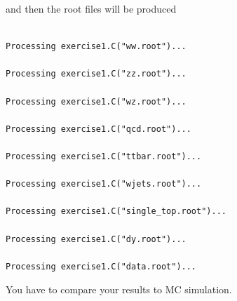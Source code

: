 \documentclass[11pt]{article}
\begin{document}
and then the root files will be produced
\begin{lstlisting}[emph={if,while,continue,new},emphstyle=\color{nut}]

Processing exercise1.C("ww.root")...

Processing exercise1.C("zz.root")...

Processing exercise1.C("wz.root")...

Processing exercise1.C("qcd.root")...

Processing exercise1.C("ttbar.root")...

Processing exercise1.C("wjets.root")...

Processing exercise1.C("single_top.root")...

Processing exercise1.C("dy.root")...

Processing exercise1.C("data.root")...

\end{lstlisting}
You have to compare your results to MC simulation. 
\end{document}
